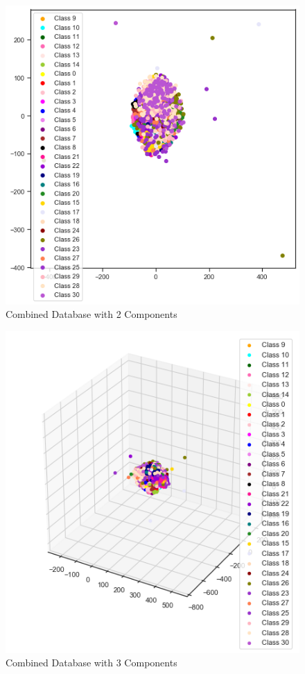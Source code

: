 \documentclass[12pt]{article}
\newenvironment{problem}[2][Problem]{\begin{trivlist}
\item[\hskip \labelsep {\bfseries #1}\hskip \labelsep {\bfseries #2.}]}{\end{trivlist}}
\begin{document}
\begin{problem}{3}
\begin{figure}[H]
	\centering
	\includegraphics[width=16cm]{Combined_Database_with_2_Components.png}
	\caption{Combined Database with 2 Components}
\end{figure}


\begin{figure}[H]
	\centering
	\includegraphics[width=16cm]{Combined_Database_with_3_Components.png}
	\caption{Combined Database with 3 Components}
\end{figure}
\end{problem}
\end{document}
